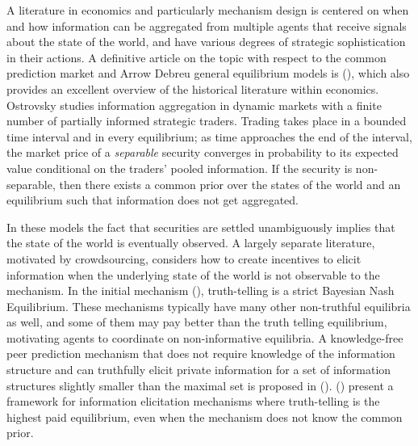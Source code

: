 A literature in economics and particularly mechanism design is centered on when and how information can be aggregated from multiple agents that receive signals about the state of the world, and have various degrees of strategic sophistication in their actions.
A definitive article on the topic with respect to the common prediction market and Arrow Debreu general equilibrium models is (\cite{ostrovsky2012information}), which also provides an excellent overview of the historical literature within economics.
Ostrovsky studies information aggregation in dynamic markets with a finite number of partially informed strategic traders. 
Trading takes place in a bounded time interval and in every equilibrium; as time approaches the end of the interval, the market price of a \emph{separable} security converges in probability to its expected value conditional on the traders' pooled information. If the security is non-separable, then there exists a common prior over the states of the world and an equilibrium such that information does not get aggregated. 


In these models the fact that securities are settled unambiguously implies that the state of the world is eventually observed.
A largely separate literature, motivated by crowdsourcing, considers how to create incentives to elicit information when the underlying state of the world is not observable to the mechanism. 
In the initial mechanism (\cite{prelec2004bayesian,miller2005eliciting}), truth-telling is a strict Bayesian Nash Equilibrium. These mechanisms typically have many other non-truthful equilibria as well, and some of them may pay better than the truth telling equilibrium, motivating agents to coordinate on non-informative equilibria.
A knowledge-free peer prediction mechanism that does not require knowledge of the information structure and can truthfully elicit private information for a set of information structures slightly smaller than the maximal set is proposed in (\cite{zhang2014elicitability}).
(\cite{kong2016framework}) present a framework for information elicitation mechanisms where truth-telling is the highest paid equilibrium, even when the mechanism does not know the common prior.









